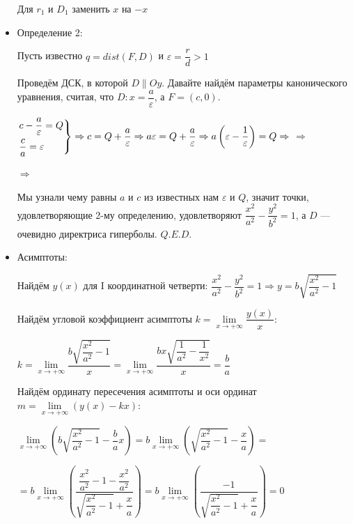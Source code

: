 \documentclass[twoside]{book}
\begin{document}
\begin{itemize}
          Для \(r_1\) и \(D_1\) заменить \(x\) на \(-x\)

    \item Определение 2:

          Пусть известно \(q = dist(F, D)\) и \(\varepsilon = \dfrac{r}{d} > 1\)

          Проведём ДСК, в которой \(D \parallel Oy\). Давайте найдём параметры канонического уравнения, считая, что \(D: x = \dfrac{a}{\varepsilon}\), а \(F = (c, 0)\).

          \(\begin{rcases}
              c - \dfrac{a}{\varepsilon} = Q \\
              \dfrac{c}{a} = \varepsilon
          \end{rcases} \Rightarrow c = Q + \dfrac{a}{\varepsilon} \Rightarrow a \varepsilon = Q + \dfrac{a}{\varepsilon} \Rightarrow a \left(\varepsilon - \dfrac{1}{\varepsilon}\right) = Q \Rightarrow\)  \(\Rightarrow\)

          \(\Rightarrow\) 

          Мы узнали чему равны \(a\) и \(c\) из известных нам \(\varepsilon\) и \(Q\), значит точки, удовлетворяющие 2-му определению, удовлетворяют \(\dfrac{x^2}{a^2} - \dfrac{y^2}{b^2} = 1\), а \(D\) --- очевидно директриса гиперболы. \(Q.E.D.\)

    \item Асимптоты:

          Найдём \(y(x)\) для I координатной четверти: \(\dfrac{x^2}{a^2} - \dfrac{y^2}{b^2} = 1 \Rightarrow y = b \sqrt{\dfrac{x^2}{a^2} - 1}\)

          Найдём угловой коэффициент асимптоты \(k = \lim\limits_{x \to +\infty}\dfrac{y(x)}{x}\):

          \(k = \lim\limits_{x \to +\infty} \dfrac{b \sqrt{\dfrac{x^2}{a^2} - 1}}{x} = \lim\limits_{x \to +\infty} \dfrac{b x \sqrt{\dfrac{1}{a^2} - \dfrac{1}{x^2}}}{x} = \dfrac{b}{a}\)

          Найдём ординату пересечения асимптоты и оси ординат \(m = \lim\limits_{x \to +\infty}(y(x) - kx)\):

          \(\lim\limits_{x \to +\infty} \left(b \sqrt{\dfrac{x^2}{a^2} - 1} - \dfrac{b}{a}x\right) = b \lim\limits_{x \to +\infty} \left(\sqrt{\dfrac{x^2}{a^2} - 1} - \dfrac{x}{a}\right) =\)

          \(=b \lim\limits_{x \to +\infty} \left(\dfrac{\dfrac{x^2}{a^2} - 1 - \dfrac{x^2}{a^2}}{\sqrt{\dfrac{x^2}{a^2} - 1} + \dfrac{x}{a}} \right) = b \lim\limits_{x \to +\infty} \left(\dfrac{-1}{\sqrt{\dfrac{x^2}{a^2} - 1} + \dfrac{x}{a}} \right) = 0\)


\end{itemize}
\end{document}
